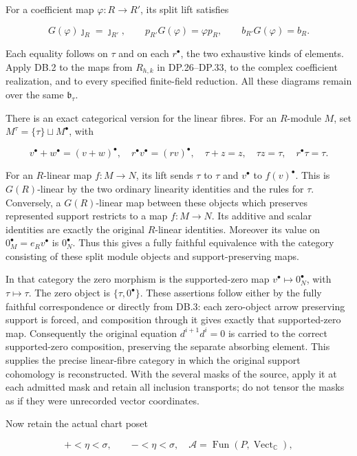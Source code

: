 \documentclass{article}
\begin{document}
For a coefficient map \(\varphi:R\to R'\), its split lift satisfies

\[
G(\varphi)\jmath_R=\jmath_{R'},\qquad
p_{R'}G(\varphi)=\varphi p_R,\qquad
b_{R'}G(\varphi)=b_R.
\tag{DB.2}
\]

Each equality follows on \(\tau\) and on each \(r^\bullet\), the two exhaustive kinds of elements. Apply DB.2 to the maps from \(R_{h,k}\) in DP.26--DP.33, to the complex coefficient realization, and to every specified finite-field reduction. All these diagrams remain over the same \(\mathfrak b_\tau\).

There is an exact categorical version for the linear fibres. For an \(R\)-module \(M\), set \(M^\tau=\{\tau\}\sqcup M^\bullet\), with

\[
v^\bullet+w^\bullet=(v+w)^\bullet,\quad
r^\bullet v^\bullet=(rv)^\bullet,
\quad \tau+z=z,
\quad \tau z=\tau,
\quad r^\bullet\tau=\tau.
\tag{DB.3}
\]

For an \(R\)-linear map \(f:M\to N\), its lift sends \(\tau\) to \(\tau\) and \(v^\bullet\) to \(f(v)^\bullet\). This is \(G(R)\)-linear by the two ordinary linearity identities and the rules for \(\tau\). Conversely, a \(G(R)\)-linear map between these objects which preserves represented support restricts to a map \(f:M\to N\). Its additive and scalar identities are exactly the original \(R\)-linear identities. Moreover its value on \(0_M^\bullet=e_Rv^\bullet\) is \(0_N^\bullet\). Thus this gives a fully faithful equivalence with the category consisting of these split module objects and support-preserving maps.

In that category the zero morphism is the supported-zero map \(v^\bullet\mapsto0_N^\bullet\), with \(\tau\mapsto\tau\). The zero object is \(\{\tau,0^\bullet\}\). These assertions follow either by the fully faithful correspondence or directly from DB.3: each zero-object arrow preserving support is forced, and composition through it gives exactly that supported-zero map. Consequently the original equation \(d^{i+1}d^i=0\) is carried to the correct supported-zero composition, preserving the separate absorbing element. This supplies the precise linear-fibre category in which the original support cohomology is reconstructed. With the several masks of the source, apply it at each admitted mask and retain all inclusion transports; do not tensor the masks as if they were unrecorded vector coordinates.

Now retain the actual chart poset

\[
+<\eta<\sigma,\qquad -<\eta<\sigma,
\quad\mathcal A=\operatorname{Fun}(P,\operatorname{Vect}_{\mathbb C}),
\tag{DB.4}
\]
\end{document}

